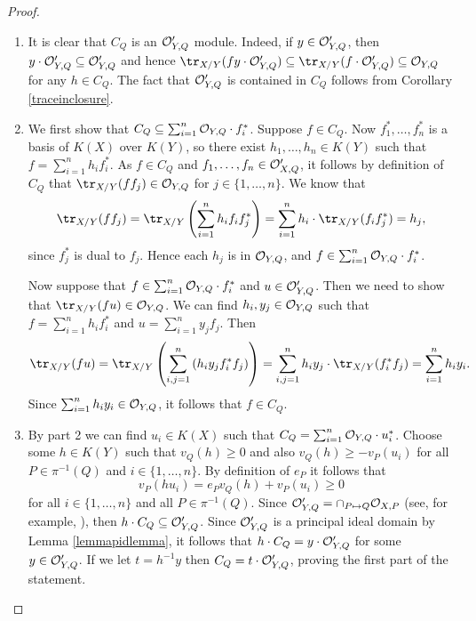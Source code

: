     \begin{proof}
        \begin{enumerate}
        \item It is clear that $C_Q$ is an ${\cal O}_{Y,Q}'$ module.
        Indeed, if $y\in {\cal O}_{Y,Q}'$, then $y\cdot {\cal O}_{Y,Q}' \subseteq {\cal O}_{Y,Q}'$ and hence $\tr_{X/Y}(f y\cdot \cO_{Y,Q}')\subseteq \tr_{X/Y}(f\cdot \cO_{Y,Q}') \subseteq \cO_{Y,Q}$ for any $h\in C_Q$.
        The fact that ${\cal O}_{Y,Q}'$ is contained in $C_Q$ follows from Corollary \ref{traceinclosure}.
        \item We first show that $C_Q \subseteq \sum_{i=1}^n {\cal O}_{Y,Q}\cdot f_i^*$.
        Suppose $f\in C_Q$.
        Now $f_1^*, \ldots ,f_n^*$ is a basis of $K(X)$ over $K(Y)$, so there exist $h_1,\ldots , h_n\in K(Y)$ such that $f=\sum_{i=1}^n h_if_i^*$.
        As $f\in C_Q$ and $f_1,\ldots ,f_n\in {\cal O}_{X,Q}'$, it follows by definition of $C_Q$ that $\tr_{X/Y}(ff_j)\in \cO_{Y,Q}$ for $j\in \{1,\ldots ,n\}$.
        We know that 
            \[
            \tr_{X/Y}(ff_j) = \tr_{X/Y}\left(\sum_{i=1}^nh_if_if_j^*\right) = \sum_{i=1}^nh_i \cdot \tr_{X/Y}(f_if_j^*) = h_j,
            \]
        since $f_j^*$ is dual to $f_j$.
        Hence each $h_j$ is in ${\cal O}_{Y,Q}$, and $f\in \sum_{i=1}^n{\cal O}_{Y,Q}\cdot f_i^*$.
        
        Now suppose that $f\in \sum_{i=1}^n{\cal O}_{Y,Q}\cdot f_i^*$ and $u\in {\cal O}_{Y,Q}'$.
        Then we need to show that $\tr_{X/Y}(f u)\in \cO_{Y,Q}$.
        We can find $h_i, y_j\in {\cal O}_{Y,Q}$ such that $f=\sum_{i=1}^n h_if_i^*$ and $u=\sum_{i=1}^ny_jf_j$.
        Then
            \[
            \tr_{X/Y}(fu) = \tr_{X/Y}\left(\sum_{i,j=1}^n \left(h_iy_jf_i^*f_j\right)\right) = \sum_{i,j=1}^n h_iy_j\cdot \tr_{X/Y}(f_i^*f_j) = \sum_{i=1}^n h_iy_i.
            \]
        Since $\sum_{i=1}^n h_iy_i\in {\cal O}_{Y,Q}$, it follows that $f\in C_Q$.
            
        \item By part 2 we can find $u_i\in K(X)$ such that $C_Q = \sum_{i=1}^n {\cal O}_{Y,Q} \cdot u_i^*$.
        Choose some $h\in K(Y)$ such that $v_Q(h)\geq 0$ and also $v_Q(h)\geq -v_P(u_i)$ for all $P\in \pi^{-1}(Q)$ and $i\in \{1,\ldots ,n\}$.
        By definition of $e_P$ it follows that
            \[ 
            v_P(hu_i) = e_Pv_Q(h) + v_P(u_i) \geq 0
            \]
        for all $i\in \{1,\ldots, n\}$ and all $P\in \pi^{-1}(Q)$.
        Since ${\cal O}'_{Y,Q} = \cap_{P\mapsto Q} {\cal O}_{X,P}$ (see, for example, \cite[Cor. 3.3.5]{stichtenoth}), then $h\cdot C_Q \subseteq {\cal O}_{Y,Q}'$.
        Since ${\cal O}_{Y,Q}'$ is a principal ideal domain by Lemma \ref{lemmapidlemma}, it follows that $h\cdot C_Q = y\cdot {\cal O}_{Y,Q}'$ for some $y\in {\cal O}_{Y,Q}'$.
        If we let $t=h^{-1}y$ then $C_Q =t\cdot {\cal O}_{Y,Q}'$, proving the first part of the statement.
        

\end{enumerate}
\end{proof}
